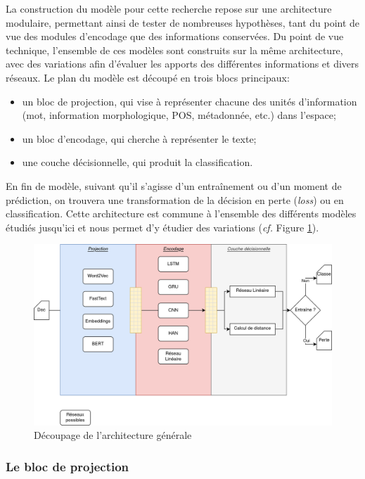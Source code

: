 La construction du modèle pour cette recherche repose sur une architecture modulaire, permettant ainsi de tester de nombreuses hypothèses, tant du point de vue des modules d'encodage que des informations conservées. Du point de vue technique, l'ensemble de ces modèles sont construits sur la même architecture, avec des variations afin d'évaluer les apports des différentes informations et divers réseaux. Le plan du modèle est découpé en trois blocs principaux: 
\begin{itemize}
    \item un bloc de projection, qui vise à représenter chacune des unités d'information (mot, information morphologique, POS, métadonnée, etc.) dans l'espace;
    \item un bloc d'encodage, qui cherche à représenter le texte;
    \item une couche décisionnelle, qui produit la classification.
\end{itemize}
En fin de modèle, suivant qu'il s'agisse d'un entraînement ou d'un moment de prédiction, on trouvera une transformation de la décision en perte (\textit{loss}) ou en classification. Cette architecture est commune à l'ensemble des différents modèles étudiés jusqu'ici et nous permet d'y étudier des variations (\textit{cf.} Figure \ref{fig:chap4:Architecture}).

\begin{figure}
    \centering
    \includegraphics[width=\linewidth]{figures/chap4/architecture.png}
    \caption{Découpage de l'architecture générale}
    \label{fig:chap4:Architecture}
\end{figure}

\subsubsection{Le bloc de projection}

